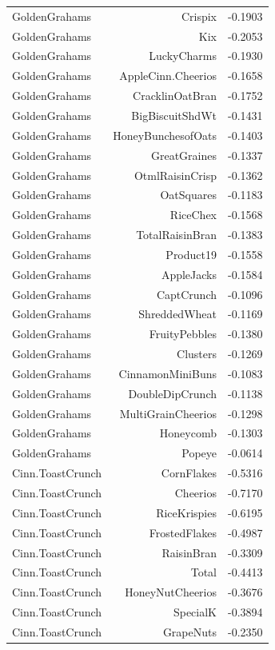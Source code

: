 \begin{longtable}{@{}lrr@{}}
GoldenGrahams & Crispix & -0.1903 \\
GoldenGrahams & Kix & -0.2053 \\
GoldenGrahams & LuckyCharms & -0.1930 \\
GoldenGrahams & AppleCinn.Cheerios & -0.1658 \\
GoldenGrahams & CracklinOatBran & -0.1752 \\
GoldenGrahams & BigBiscuitShdWt & -0.1431 \\
GoldenGrahams & HoneyBunchesofOats & -0.1403 \\
GoldenGrahams & GreatGraines & -0.1337 \\
GoldenGrahams & OtmlRaisinCrisp & -0.1362 \\
GoldenGrahams & OatSquares & -0.1183 \\
GoldenGrahams & RiceChex & -0.1568 \\
GoldenGrahams & TotalRaisinBran & -0.1383 \\
GoldenGrahams & Product19 & -0.1558 \\
GoldenGrahams & AppleJacks & -0.1584 \\
GoldenGrahams & CaptCrunch & -0.1096 \\
GoldenGrahams & ShreddedWheat & -0.1169 \\
GoldenGrahams & FruityPebbles & -0.1380 \\
GoldenGrahams & Clusters & -0.1269 \\
GoldenGrahams & CinnamonMiniBuns & -0.1083 \\
GoldenGrahams & DoubleDipCrunch & -0.1138 \\
GoldenGrahams & MultiGrainCheerios & -0.1298 \\
GoldenGrahams & Honeycomb & -0.1303 \\
GoldenGrahams & Popeye & -0.0614 \\
Cinn.ToastCrunch & CornFlakes & -0.5316 \\
Cinn.ToastCrunch & Cheerios & -0.7170 \\
Cinn.ToastCrunch & RiceKrispies & -0.6195 \\
Cinn.ToastCrunch & FrostedFlakes & -0.4987 \\
Cinn.ToastCrunch & RaisinBran & -0.3309 \\
Cinn.ToastCrunch & Total & -0.4413 \\
Cinn.ToastCrunch & HoneyNutCheerios & -0.3676 \\
Cinn.ToastCrunch & SpecialK & -0.3894 \\
Cinn.ToastCrunch & GrapeNuts & -0.2350 \\

\end{longtable}
